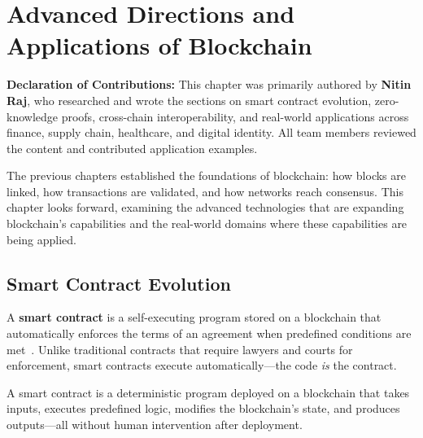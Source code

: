 \chapter{Advanced Directions and Applications of Blockchain}
\label{ch:applications}

\noindent\textbf{Declaration of Contributions:} This chapter was primarily authored by \textbf{Nitin Raj}, who researched and wrote the sections on smart contract evolution, zero-knowledge proofs, cross-chain interoperability, and real-world applications across finance, supply chain, healthcare, and digital identity. All team members reviewed the content and contributed application examples.

\bigskip

The previous chapters established the foundations of blockchain: how blocks are linked, how transactions are validated, and how networks reach consensus. This chapter looks forward, examining the advanced technologies that are expanding blockchain's capabilities and the real-world domains where these capabilities are being applied.

\section{Smart Contract Evolution}
\label{sec:smart-contracts}
 
A \textbf{smart contract} is a self-executing program stored on a blockchain that automatically enforces the terms of an agreement when predefined conditions are met~\cite{buterin2014ethereum, wood2014ethereum}. Unlike traditional contracts that require lawyers and courts for enforcement, smart contracts execute automatically---the code \emph{is} the contract.

\begin{definition}
\label{def:smart-contract}
A smart contract is a deterministic program deployed on a blockchain that takes inputs, executes predefined logic, modifies the blockchain's state, and produces outputs---all without human intervention after deployment.
\end{definition}


